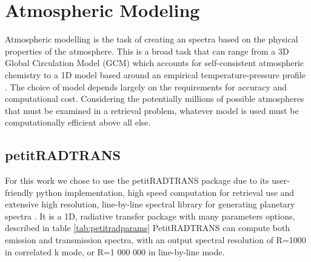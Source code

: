 \cite{Batalha2018}%
\cite{Feng2018} %
\cite{Molliere2019}%
\section{Atmospheric Modeling}
Atmospheric modelling is the task of creating an spectra based on the physical properties of the atmosphere.
This is a broad task that can range from a 3D Global Circulation Model (GCM) which accounts for self-consistent atmospheric chemistry \autocite{Chen2019} to a 1D model based around an empirical temperature-pressure profile \autocite{Molliere2019}.
The choice of model depends largely on the requirements for accuracy and computational cost. 
Considering the potentially millions of possible atmospheres that must be examined in a retrieval problem, whatever model is used must be computationally efficient above all else.

\cite{Zhang2019} %
\subsection{petitRADTRANS}
For this work we chose to use the petitRADTRANS package due to its user-friendly python implementation, high speed computation for retrieval use and extensive high resolution, line-by-line spectral library for generating planetary spectra \autocite{Molliere2019}. 
It is a 1D, radiative transfer package with many parameters options, described in table \ref{tab:petitradparams}
PetitRADTRANS can compute both emission and transmission spectra, with an output spectral resolution of R=1000 in correlated k mode, or R=1 000 000 in line-by-line mode. 


